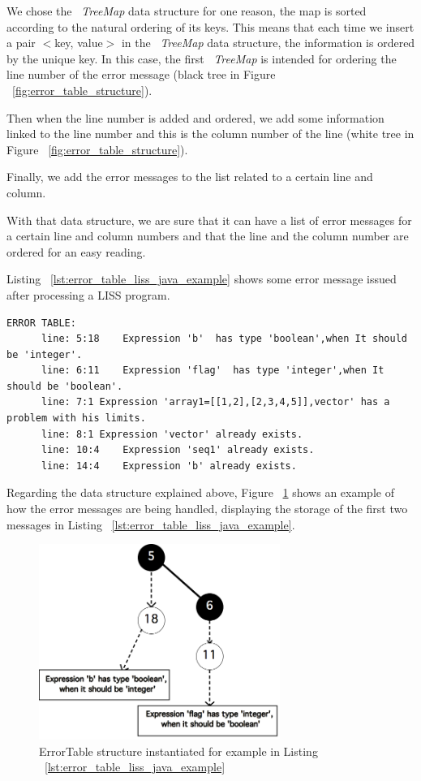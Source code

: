 \documentclass[
  oneside,
  11pt, a4paper,
  footinclude=true,
  headinclude=true,
  cleardoublepage=empty
]{scrbook}
\begin{document}
We chose the ~\textit{TreeMap} data structure for one reason, the map is sorted according to the natural ordering of its keys.
This means that each time we insert a pair $<$key, value$>$ in the ~\textit{TreeMap} data structure, the information is ordered by the unique key.
In this case, the first ~\textit{TreeMap} is intended for ordering the line number of the error message (black tree in Figure ~\ref{fig:error_table_structure}).

Then when the line number is added and ordered, we add some information linked to the line number and this is the column number of the line (white tree in Figure ~\ref{fig:error_table_structure}).

Finally, we add the error messages to the list related to a certain line and column.

With that data structure, we are sure that it can have a list of error messages for a certain line and column numbers and that the line and the column number are ordered for an easy reading.

Listing ~\ref{lst:error_table_liss_java_example} shows some error message issued after processing a LISS program.

\begin{lstlisting}[caption={Example of an error table},label={lst:error_table_liss_java_example}]
	ERROR TABLE:
	  line: 5:18	Expression 'b'  has type 'boolean',when It should be 'integer'.
	  line: 6:11	Expression 'flag'  has type 'integer',when It should be 'boolean'.
	  line: 7:1	Expression 'array1=[[1,2],[2,3,4,5]],vector' has a problem with his limits.
	  line: 8:1	Expression 'vector' already exists.
	  line: 10:4	Expression 'seq1' already exists.
	  line: 14:4	Expression 'b' already exists.
\end{lstlisting}

Regarding the data structure explained above, Figure ~\ref{fig:error_table_structure_example} shows an example of how the error messages are being handled, displaying the storage of the first two messages in Listing ~\ref{lst:error_table_liss_java_example}.

\begin{figure}[h!]
  \centering
    \includegraphics[width=0.7\textwidth]{img/error_message_example_treemap.png}
    \caption{ErrorTable structure instantiated for example in Listing ~\ref{lst:error_table_liss_java_example}}
    \label{fig:error_table_structure_example}
\end{figure}
\end{document}
